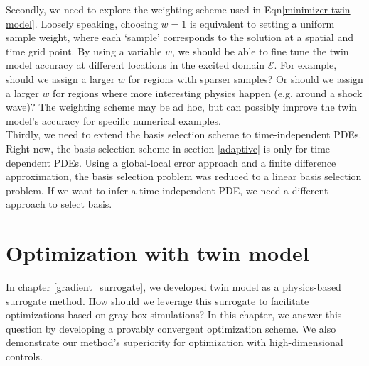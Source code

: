 \documentclass[a4paper,onecolumn]{article}
\theoremstyle{remark}
\begin{document}
\noindent Secondly, we need to explore the weighting scheme used in Eqn\eqref{minimizer twin model}.
Loosely speaking, choosing $w=1$ is equivalent to setting a uniform sample weight, where each `sample'
corresponds to the solution at a spatial and time grid point.
By using a variable $w$, we should be able to fine tune the twin model accuracy at different locations
in the excited domain $\mathcal{E}$. For example, should we assign a larger $w$
for regions with sparser samples? Or should we assign a larger $w$ for regions where
more interesting physics happen (e.g. around a shock wave)?
The weighting scheme may be ad hoc, but can possibly 
improve the twin model's accuracy for specific numerical examples.\\



\noindent Thirdly, we need to extend the basis selection scheme to time-independent PDEs.
Right now, the basis selection scheme in section \ref{adaptive} is only for time-dependent PDEs.
Using a global-local error approach and a finite difference approximation, the basis
selection problem was reduced to a linear basis selection problem. If we want to infer
a time-independent PDE, we need a different approach to select basis. 

\newpage
\section{Optimization with twin model}
\noindent In chapter \ref{gradient_surrogate},
we developed twin model as a physics-based surrogate method.
How should we leverage this surrogate to facilitate optimizations based on gray-box simulations?
In this chapter, we answer this question by developing a provably convergent optimization scheme.
We also demonstrate our method's superiority for optimization with high-dimensional controls.\\
\end{document}
